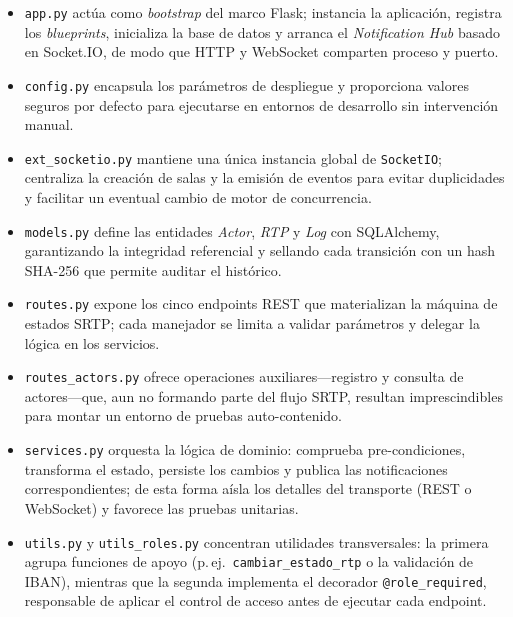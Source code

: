 \begin{itemize}
  \item \texttt{app.py} actúa como \emph{bootstrap} del marco Flask;
        instancia la aplicación, registra los \emph{blueprints},
        inicializa la base de datos y arranca el \emph{Notification Hub}
        basado en Socket.IO, de modo que HTTP y WebSocket
        comparten proceso y puerto.
  \item \texttt{config.py} encapsula los parámetros de despliegue
        y proporciona
        valores seguros por defecto para ejecutarse
        en entornos de desarrollo sin intervención manual.
  \item \texttt{ext\_socketio.py} mantiene una única instancia global
        de \texttt{SocketIO}; centraliza la creación de salas
        y la emisión de eventos para evitar duplicidades y facilitar
        un eventual cambio de motor de concurrencia.
  \item \texttt{models.py} define las entidades
        \emph{Actor}, \emph{RTP} y \emph{Log} con SQLAlchemy,
        garantizando la integridad referencial y sellando cada transición
        con un hash SHA-256 que permite auditar el histórico.
  \item \texttt{routes.py} expone los cinco endpoints REST
        que materializan la máquina de estados SRTP; cada manejador se
        limita a validar parámetros y delegar la lógica en los servicios.
  \item \texttt{routes\_actors.py} ofrece
        operaciones auxiliares—registro y consulta de actores—que,
        aun no formando parte del flujo SRTP, resultan imprescindibles
        para montar un entorno de pruebas auto-contenido.
  \item \texttt{services.py} orquesta la lógica de dominio:
        comprueba pre-condiciones, transforma el estado,
        persiste los cambios y publica las notificaciones correspondientes;
        de esta forma aísla los detalles del transporte (REST o WebSocket)
        y favorece las pruebas unitarias.
  \item \texttt{utils.py} y \texttt{utils\_roles.py} concentran
        utilidades transversales: la primera agrupa funciones de apoyo
        (p.\,ej.\  \texttt{cambiar\_estado\_rtp} o la validación de IBAN),
        mientras que la segunda implementa el decorador
        \texttt{@role\_required}, responsable de aplicar el control de
        acceso antes de ejecutar cada endpoint.
\end{itemize}

